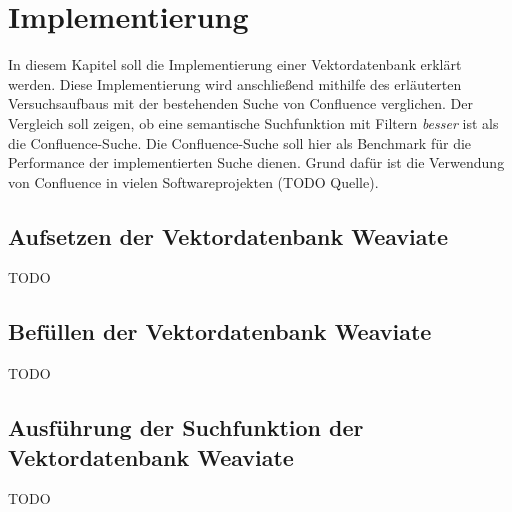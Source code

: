 \chapter{Implementierung}

In diesem Kapitel soll die Implementierung einer Vektordatenbank erklärt werden.
Diese Implementierung wird anschließend mithilfe des erläuterten Versuchsaufbaus mit der bestehenden Suche von Confluence verglichen.
Der Vergleich soll zeigen, ob eine semantische Suchfunktion mit Filtern \textit{besser} ist als die Confluence-Suche.
Die Confluence-Suche soll hier als Benchmark für die Performance der implementierten Suche dienen.
Grund dafür ist die Verwendung von Confluence in vielen Softwareprojekten (TODO Quelle).\\

\section{Aufsetzen der Vektordatenbank Weaviate}
TODO

\section{Befüllen der Vektordatenbank Weaviate}
TODO

\section{Ausführung der Suchfunktion der Vektordatenbank Weaviate}
TODO